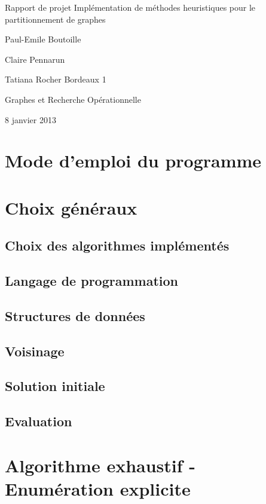 \documentclass[12pt]{article}
\begin{document}
\begin{titlepage}
\begin{center}

\hfill
\vfill
\bigskip
\huge{Rapport de projet} 
\vfill
\bigskip 
\Huge 
\bigskip Implémentation de méthodes heuristiques pour le partitionnement de graphes \par 
\vfill
\Large Paul-Emile Boutoille \par
		Claire Pennarun \par 
		Tatiana Rocher
\vfill
\Large Bordeaux 1 \par \Large Graphes et Recherche Opérationnelle		
		\bigskip 
\bigskip

\Large
8 janvier 2013
\end{center}
\end{titlepage}

\tableofcontents

\section{Mode d'emploi du programme}

\section{Choix généraux}

\subsection{Choix des algorithmes implémentés}
\subsection{Langage de programmation}
\subsection{Structures de données}
\subsection{Voisinage}
\subsection{Solution initiale}
\subsection{Evaluation}

\section{Algorithme exhaustif - Enumération explicite}
\end{document}
